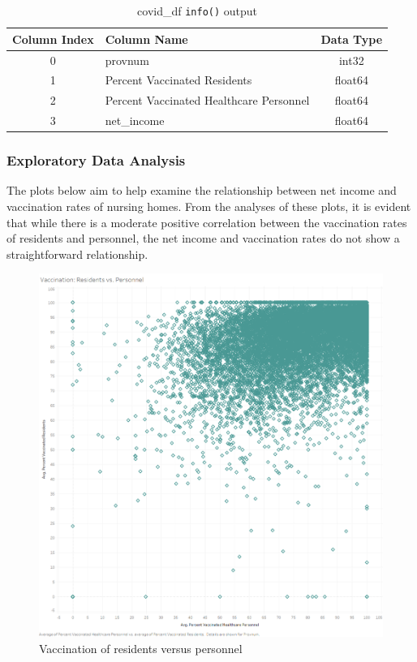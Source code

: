 \documentclass{article}
\theoremstyle{mytheoremstyle}
\theoremstyle{mytheoremstyle}
\theoremstyle{myproblemstyle}
\begin{document}
\begin{table}[h]
\centering
\caption{covid\_df \texttt{info()} output}
\label{tab:new_dataframe_structure}
\begin{tabular}{|c|l|c|}
\hline
\textbf{Column Index} & \textbf{Column Name}                               & \textbf{Data Type} \\ \hline
0                     & provnum                                            & int32              \\ \hline
1                     & Percent Vaccinated Residents                       & float64            \\ \hline
2                     & Percent Vaccinated Healthcare Personnel            & float64            \\ \hline
3                     & net\_income                                        & float64            \\ \hline
\end{tabular}
\end{table}


\subsubsection{Exploratory Data Analysis}
The plots below aim to help examine the relationship between net income and vaccination rates of nursing homes. From the analyses of these plots, it is evident that while there is a moderate positive correlation between the vaccination rates of residents and personnel, the net income and vaccination rates do not show a straightforward relationship.
\begin{figure}[htbp]
\centering
\includegraphics[width=0.6\linewidth]{Images/Vaccination Residents vs. Personnel.png}
\caption{Vaccination of residents versus personnel}
\label{fig:vaccination scatterplot}
\end{figure}
\end{document}
